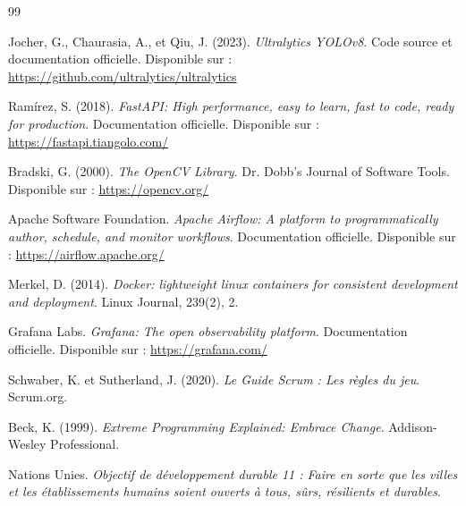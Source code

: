 \documentclass[12pt, a4paper]{report}
\begin{document}
\begin{thebibliography}{99}

Jocher, G., Chaurasia, A., et Qiu, J. (2023). \textit{Ultralytics YOLOv8}. Code source et documentation officielle. Disponible sur : \url{https://github.com/ultralytics/ultralytics}

Ramírez, S. (2018). \textit{FastAPI: High performance, easy to learn, fast to code, ready for production}. Documentation officielle. Disponible sur : \url{https://fastapi.tiangolo.com/}

Bradski, G. (2000). \textit{The OpenCV Library}. Dr. Dobb's Journal of Software Tools. Disponible sur : \url{https://opencv.org/}

Apache Software Foundation. \textit{Apache Airflow: A platform to programmatically author, schedule, and monitor workflows}. Documentation officielle. Disponible sur : \url{https://airflow.apache.org/}

Merkel, D. (2014). \textit{Docker: lightweight linux containers for consistent development and deployment}. Linux Journal, 239(2), 2.

Grafana Labs. \textit{Grafana: The open observability platform}. Documentation officielle. Disponible sur : \url{https://grafana.com/}

Schwaber, K. et Sutherland, J. (2020). \textit{Le Guide Scrum : Les règles du jeu}. Scrum.org.

Beck, K. (1999). \textit{Extreme Programming Explained: Embrace Change}. Addison-Wesley Professional.

Nations Unies. \textit{Objectif de développement durable 11 : Faire en sorte que les villes et les établissements humains soient ouverts à tous, sûrs, résilients et durables}.

\end{thebibliography}
\end{document}
